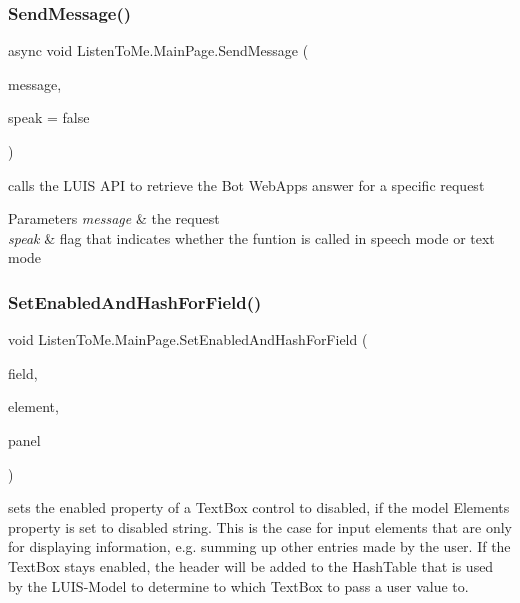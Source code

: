 \subsubsection{\texorpdfstring{Send\+Message()}{SendMessage()}}
{\footnotesize\ttfamily async void Listen\+To\+Me.\+Main\+Page.\+Send\+Message (\begin{DoxyParamCaption}\item[{string}]{message,  }\item[{bool}]{speak = {\ttfamily false} }\end{DoxyParamCaption})\hspace{0.3cm}{\ttfamily [private]}}



calls the L\+U\+IS A\+PI to retrieve the Bot Web\+App\textquotesingle{}s answer for a specific request 


\begin{DoxyParams}{Parameters}
{\em message} & the request\\
\hline
{\em speak} & flag that indicates whether the funtion is called in speech mode or text mode\\
\hline
\end{DoxyParams}
\mbox{\label{class_listen_to_me_1_1_main_page_a03c7cef2603da00588c9a6a87fde49b1}} 
\subsubsection{\texorpdfstring{Set\+Enabled\+And\+Hash\+For\+Field()}{SetEnabledAndHashForField()}}
{\footnotesize\ttfamily void Listen\+To\+Me.\+Main\+Page.\+Set\+Enabled\+And\+Hash\+For\+Field (\begin{DoxyParamCaption}\item[{Text\+Box}]{field,  }\item[{Element}]{element,  }\item[{Stack\+Panel}]{panel }\end{DoxyParamCaption})\hspace{0.3cm}{\ttfamily [private]}}



sets the enabled property of a Text\+Box control to disabled, if the model Element\textquotesingle{}s property is set to \textquotesingle{}disabled\textquotesingle{} string. This is the case for input elements that are only for displaying information, e.\+g. summing up other entries made by the user. If the Text\+Box stays enabled, the header will be added to the Hash\+Table that is used by the L\+U\+I\+S-\/\+Model to determine to which Text\+Box to pass a user value to. 


